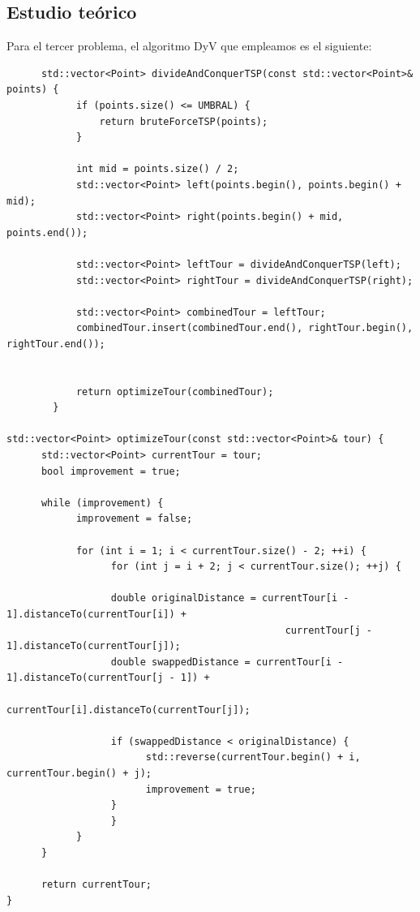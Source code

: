 \documentclass[11pt,openany]{book}
\begin{document}
\subsection{Estudio teórico}
Para el tercer problema, el algoritmo DyV que empleamos es el siguiente:
\begin{lstlisting}
      std::vector<Point> divideAndConquerTSP(const std::vector<Point>& points) {
            if (points.size() <= UMBRAL) {
                return bruteForceTSP(points);
            }
        
            int mid = points.size() / 2;
            std::vector<Point> left(points.begin(), points.begin() + mid);
            std::vector<Point> right(points.begin() + mid, points.end());
        
            std::vector<Point> leftTour = divideAndConquerTSP(left);
            std::vector<Point> rightTour = divideAndConquerTSP(right);
        
            std::vector<Point> combinedTour = leftTour;
            combinedTour.insert(combinedTour.end(), rightTour.begin(), rightTour.end());
        
        
            return optimizeTour(combinedTour);
        }

std::vector<Point> optimizeTour(const std::vector<Point>& tour) {
      std::vector<Point> currentTour = tour;
      bool improvement = true;

      while (improvement) {
            improvement = false;

            for (int i = 1; i < currentTour.size() - 2; ++i) {
                  for (int j = i + 2; j < currentTour.size(); ++j) {

                  double originalDistance = currentTour[i - 1].distanceTo(currentTour[i]) +
                                                currentTour[j - 1].distanceTo(currentTour[j]);
                  double swappedDistance = currentTour[i - 1].distanceTo(currentTour[j - 1]) +
                                          currentTour[i].distanceTo(currentTour[j]);

                  if (swappedDistance < originalDistance) {
                        std::reverse(currentTour.begin() + i, currentTour.begin() + j);
                        improvement = true;
                  }
                  }
            }
      }

      return currentTour;
}
\end{lstlisting}
\end{document}
